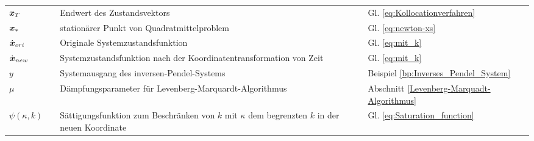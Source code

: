\begin{small}
\begin{supertabular}{lcp{0.62\textwidth}cp{0.19\textwidth}}
		$\boldsymbol x_{T}$ && Endwert des Zustandsvektors && Gl. \ref{eq:Kollocationverfahren}\\
		$\boldsymbol x_{\ast}$ && stationärer Punkt von Quadratmittelproblem && Gl. \ref{eq:newton-xs}\\
		$\dot{\boldsymbol x}_{ori}$ && Originale Systemzustandsfunktion && Gl. \ref{eq:mit_k}\\
		$\dot{\boldsymbol x}_{new}$ && Systemzustandsfunktion nach der Koordinatentransformation von Zeit  && Gl. \ref{eq:mit_k}\\
		$y$ && Systemausgang des inversen-Pendel-Systems && Beispiel \ref{bp:Inverses_Pendel_System}\\
		$\mu$ && Dämpfungsparameter für Levenberg-Marquardt-Algorithmus && Abschnitt \ref{Levenberg-Marquadt-Algorithmus}\\
		$\psi(\kappa,k)$ && Sättigungsfunktion zum Beschränken von $k$ mit $\kappa$ dem begrenzten $k$ in der neuen Koordinate && Gl. \ref{eq:Saturation_function}\\
	\end{supertabular}
	
\end{small}